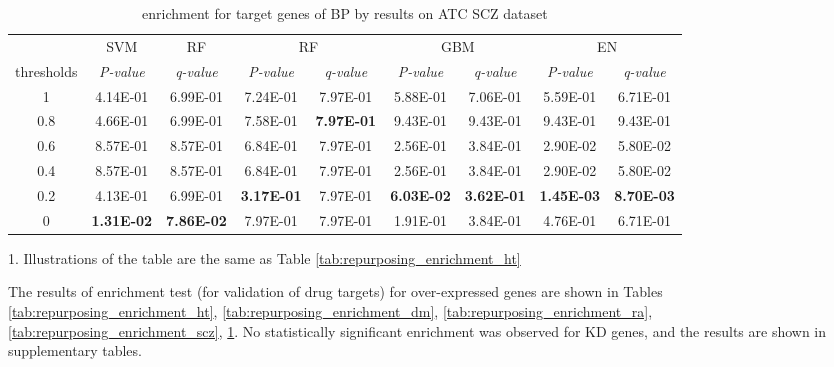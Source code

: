         \begin{table}[htbp]
          \centering
          \caption{enrichment for target genes of BP by results on ATC SCZ dataset}
          \begin{threeparttable}
            \tabcolsep=0.10cm
            \begin{tabular}{ccccccccc}
            \toprule
                  & SVM   & RF    & \multicolumn{2}{c}{RF} & \multicolumn{2}{c}{GBM} & \multicolumn{2}{c}{EN} \\
            thresholds & \textit{P-value} & \textit{q-value} & \textit{P-value} & \textit{q-value} & \textit{P-value} & \textit{q-value} & \textit{P-value} & \textit{q-value} \\
            \midrule
            1     & 4.14E-01 & 6.99E-01 & 7.24E-01 & 7.97E-01 & 5.88E-01 & 7.06E-01 & 5.59E-01 & 6.71E-01 \\
            0.8   & 4.66E-01 & 6.99E-01 & 7.58E-01 & \textbf{7.97E-01} & 9.43E-01 & 9.43E-01 & 9.43E-01 & 9.43E-01 \\
            0.6   & 8.57E-01 & 8.57E-01 & 6.84E-01 & 7.97E-01 & 2.56E-01 & 3.84E-01 & 2.90E-02 & 5.80E-02 \\
            0.4   & 8.57E-01 & 8.57E-01 & 6.84E-01 & 7.97E-01 & 2.56E-01 & 3.84E-01 & 2.90E-02 & 5.80E-02 \\
            0.2   & 4.13E-01 & 6.99E-01 & \textbf{3.17E-01} & 7.97E-01 & \textbf{6.03E-02} & \textbf{3.62E-01} & \textbf{1.45E-03} & \textbf{8.70E-03} \\
            0     & \textbf{1.31E-02} & \textbf{7.86E-02} & 7.97E-01 & 7.97E-01 & 1.91E-01 & 3.84E-01 & 4.76E-01 & 6.71E-01 \\
            \midrule
            \end{tabular}%
            \begin{tablenotes}
              \item 1. Illustrations of the table are the same as Table \ref{tab:repurposing_enrichment_ht}
            \end{tablenotes}
          \end{threeparttable}
          \label{tab:repurposing_enrichment_bp}%
        \end{table}%

    The results of enrichment test (for validation of drug targets) for over-expressed genes are shown in Tables \ref{tab:repurposing_enrichment_ht}, \ref{tab:repurposing_enrichment_dm}, \ref{tab:repurposing_enrichment_ra}, \ref{tab:repurposing_enrichment_scz}, \ref{tab:repurposing_enrichment_bp}. No statistically significant enrichment was observed for KD genes, and the results are shown in supplementary tables. 
    

